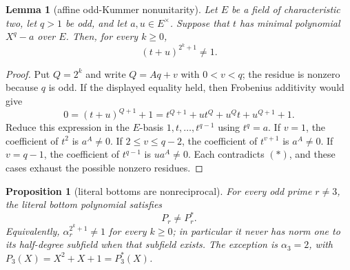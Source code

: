 \documentclass[11pt]{article}
\newtheorem{proposition}[theorem]{Proposition}
\newtheorem{lemma}[theorem]{Lemma}
\theoremstyle{definition}
\theoremstyle{remark}
\begin{document}
\begin{lemma}[affine odd-Kummer nonunitarity]
\label{lem:o-affine-kummer}
Let $E$ be a field of characteristic two, let $q>1$ be odd, and let
$a,u\in E^\times$.  Suppose that $t$ has minimal polynomial $X^q-a$ over
$E$.  Then, for every $k\geq0$,
\[
 (t+u)^{2^k+1}\ne1.
\]
\end{lemma}

\begin{proof}
Put $Q=2^k$ and write $Q=Aq+v$ with $0<v<q$; the residue is nonzero because
$q$ is odd.  If the displayed equality held, then Frobenius additivity would
give
\[
 0=(t+u)^{Q+1}+1
  =t^{Q+1}+u t^Q+u^Qt+u^{Q+1}+1.             \tag{\(*\)}
\]
Reduce this expression in the $E$-basis $1,t,\ldots,t^{q-1}$ using
$t^q=a$.  If $v=1$, the coefficient of $t^2$ is $a^A\ne0$.  If
$2\leq v\leq q-2$, the coefficient of $t^{v+1}$ is $a^A\ne0$.  If
$v=q-1$, the coefficient of $t^{q-1}$ is $ua^A\ne0$.  Each contradicts
\((*)\), and these cases exhaust the possible nonzero residues.
\end{proof}

\begin{proposition}[literal bottoms are nonreciprocal]
\label{prop:o-bottom-not-first}
For every odd prime $r\ne3$, the literal bottom polynomial satisfies
\[
 P_r\ne P_r^*.
\]
Equivalently, $\alpha_r^{2^k+1}\ne1$ for every $k\geq0$; in particular
it never has norm one to its half-degree subfield when that subfield exists.
The exception is
$\alpha_3=2$, with $P_3(X)=X^2+X+1=P_3^*(X)$.
\end{proposition}
\end{document}
